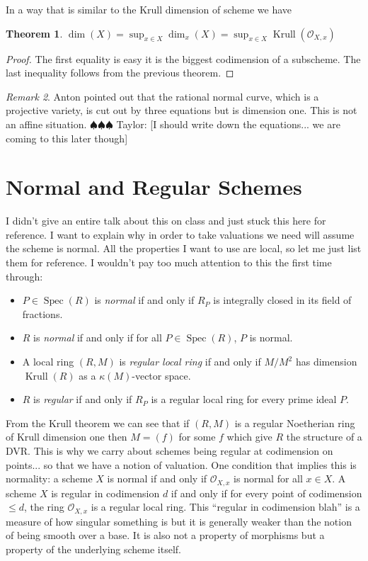 \documentclass[12pt]{article}
\numberwithin{equation}{section}
\newtheorem{theorem}{Theorem}[subsection]
\theoremstyle{definition}
\theoremstyle{remark}
\newtheorem{remark}[theorem]{Remark}
\newcommand{\Ocal}{\mathcal{O}}
\newcommand{\Spec}{\operatorname{Spec}}
\newcommand{\Krull}{\operatorname{Krull}}
\newcommand{\taylor}[1]{{\color{blue} \sf $\spadesuit\spadesuit\spadesuit$ Taylor: [#1]}}
\begin{document}
In a way that is similar to the Krull dimension of scheme we have 
\begin{theorem}
	$\dim(X) = \sup_{x\in X} \dim_x(X)=\sup_{x\in X} \Krull(\Ocal_{X,x})$
\end{theorem}
\begin{proof}
	The first equality is easy it is the biggest codimension of a subscheme. 
	The last inequality follows from the previous theorem.
\end{proof}

\begin{remark}
	Anton pointed out that the rational normal curve, which is a projective variety, is cut out by three equations but is dimension one. 
	This is not an affine situation.
	\taylor{I should write down the equations... we are coming to this later though}
\end{remark}

\section{Normal and Regular Schemes}
I didn't give an entire talk about this on class and just stuck this here for reference.
I want to explain why in order to take valuations we need will assume the scheme is normal. 
All the properties I want to use are local, so let me just list them for reference. 
I wouldn't pay too much attention to this the first time through:
\begin{itemize}
	\item $P \in \Spec(R)$ is \emph{normal} if and only if $R_P$ is integrally closed in its field of fractions. 
	\item $R$ is \emph{normal} if and only if for all $P\in \Spec(R)$, $P$ is normal.
	\item A local ring $(R,M)$ is \emph{regular local ring} if and only if $M/M^2$ has dimension $\Krull(R)$ as a $\kappa(M)$-vector space.
	\item $R$ is \emph{regular} if and only if $R_P$ is a regular local ring for every prime ideal $P$.
\end{itemize}

From the Krull theorem we can see that if $(R,M)$ is a regular Noetherian ring of Krull dimension one then $M=(f)$ for some $f$ which give $R$ the structure of a DVR. 
This is why we carry about schemes being regular at codimension on points... so that we have a notion of valuation. 
One condition that implies this is normality: a scheme $X$ is normal if and only if $\Ocal_{X,x}$ is normal for all $x\in X$.
A scheme $X$ is regular in codimension $d$ if and only if for every point of codimension $\leq d$, the ring $\Ocal_{X,x}$ is a regular local ring. 
This ``regular in codimension blah'' is a measure of how singular something is but it is generally weaker than the notion of being smooth over a base. 
It is also not a property of morphisms but a property of the underlying scheme itself. 
\end{document}
